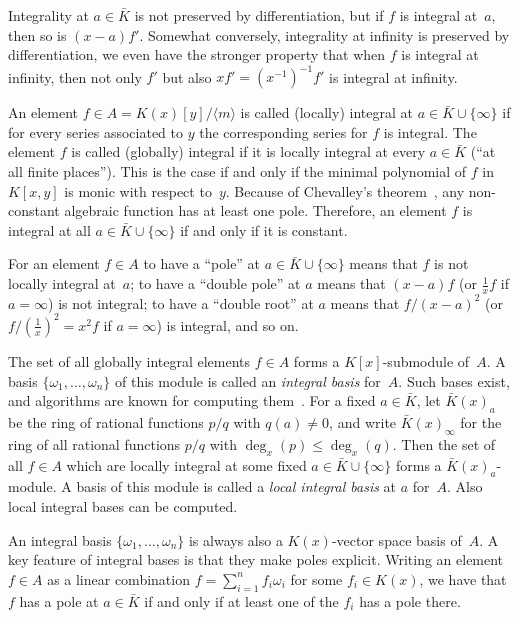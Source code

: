 \documentclass{sig-alternate}
\def\<#1>{\langle#1\rangle}
\begin{document}
Integrality at $a\in\bar K$ is not preserved by differentiation,
but if $f$ is integral at~$a$, then so is $(x-a)f'$. Somewhat conversely,
integrality at infinity is preserved by differentiation, we even have the
stronger property that when $f$ is integral at infinity, then not only $f'$ but also $xf'=(x^{-1})^{-1}f'$ is
integral at infinity.

An element $f\in A=K(x)[y]/\<m>$
is called (locally) integral at $a\in\bar K\cup\{\infty\}$ if for every series
associated to $y$ the corresponding series for $f$ is integral.
The element $f$ is called (globally) integral if it is locally integral at every
$a\in\bar K$ (``at all finite places'').
This is the case if and only if the minimal polynomial of $f$ in $K[x,y]$ is monic
with respect to~$y$.
Because of Chevalley's theorem~\cite[page 9, Corollary 3]{Chevalley1951}, any
non-constant algebraic function has at least one pole. Therefore, an element $f$ is
integral at all $a\in\bar K\cup\{\infty\}$ if and only if it is constant.

For an element $f\in A$ to have a ``pole'' at $a\in\bar K\cup\{\infty\}$ means
that $f$ is not locally integral at~$a$; to have a ``double pole'' at $a$ means
that $(x-a)f$ (or $\frac1xf$ if $a=\infty$) is not integral; to have a ``double
root'' at $a$ means that $f/(x-a)^2$ (or $f/(\frac1x)^2=x^2f$ if $a=\infty$) is integral,
and so on.

The set of all globally integral elements $f\in A$ forms a $K[x]$-submodule of~$A$.
A basis $\{\omega_1,\dots,\omega_n\}$ of this module is called an \emph{integral basis}
for~$A$. Such bases exist, and algorithms are known for computing them~\cite{trager84,Rybowicz:1991:ACI:120694.120715,vanHoeij94}.
For a fixed $a\in\bar K$, let $\bar K(x)_a$ be the ring of rational functions $p/q$
with $q(a)\neq0$, and write $\bar K(x)_\infty$ for the ring of all
rational functions $p/q$ with $\deg_x(p)\leq\deg_x(q)$.
Then the set of all $f\in A$ which are locally integral at some
fixed $a\in\bar K\cup\{\infty\}$ forms a $\bar K(x)_a$-module. A basis of this module is
called a \emph{local integral basis} at $a$ for~$A$. Also local integral bases can
be computed.

An integral basis $\{\omega_1,\dots,\omega_n\}$ is always also a $K(x)$-vector space
basis of~$A$. A key feature of integral bases is that they make poles explicit. Writing
an element $f\in A$ as a linear combination $f=\sum_{i=1}^n f_i\omega_i$ for some
$f_i\in K(x)$, we have that $f$ has a pole at $a\in\bar K$ if and only if at least one
of the $f_i$ has a pole there.
\end{document}
